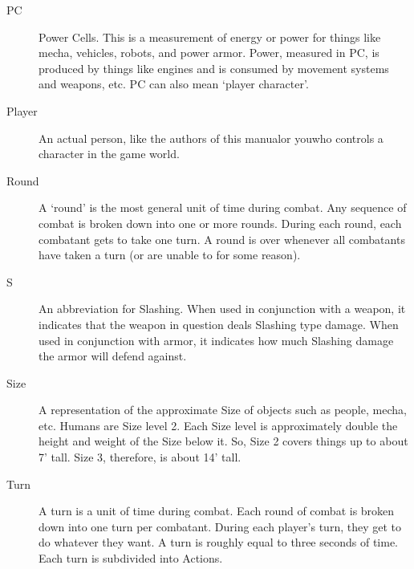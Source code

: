 \documentclass[twoside]{book}
\begin{document}
\begin{description}
  \item[ PC ] 
    {  
      Power Cells. This is a measurement of energy or
                 power for things like mecha, vehicles, robots, and power
                 armor. Power, measured in PC, is produced by things like
                 engines and is consumed by movement systems and weapons,
                 etc. PC can also mean `player character'.
                 
    }
  
  \item[ Player ] 
    {  
      An actual person, like the authors of this
                 manualor youwho controls a character in
                 the game world. 
    }
  
  \item[ Round ] 
    {  
      A `round' is the most general unit of
                 time during combat. Any sequence of combat is broken
                 down into one or more rounds. During each round, each
                 combatant gets to take one turn. A round is over
                 whenever all combatants have taken a turn (or are unable
                 to for some reason). 
    }
  
  \item[ S ] 
    {  
      An abbreviation for Slashing. When used in
                 conjunction with a weapon, it indicates that the weapon
                 in question deals Slashing type damage. When used in
                 conjunction with armor, it indicates how much Slashing
                 damage the armor will defend against. 
    }
  
  \item[ Size ] 
    {  
      A representation of the approximate Size of
                 objects such as people, mecha, etc. Humans are Size
                 level 2. Each Size level is approximately double the
                 height and weight of the Size below it. So, Size 2
                 covers things up to about 7' tall. Size 3,
                 therefore, is about 14' tall. 
    }
  
  \item[ Turn ] 
    {  
      A turn is a unit of time during combat. Each
                 round of combat is broken down into one turn per
                 combatant. During each player's turn, they get to
                 do whatever they want. A turn is roughly equal to three
                 seconds of time. Each turn is subdivided into Actions.
                 
}
\end{description}
\end{document}
